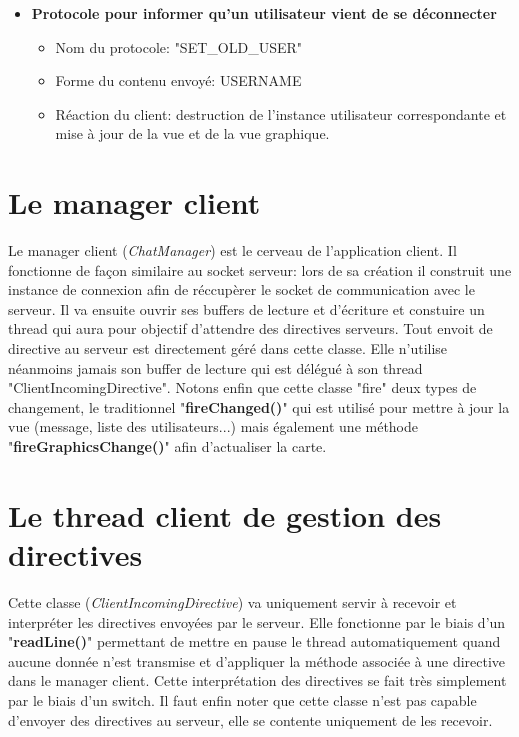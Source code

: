 \documentclass[a4paper,12pt]{report}
\begin{document}
\begin{itemize}
\begin{itemize}
        \end{itemize}
      \item \textbf{Protocole pour informer qu'un utilisateur vient de se déconnecter}
        \begin{itemize}
          \item Nom du protocole: "SET\_OLD\_USER"
          \item Forme du contenu envoyé: USERNAME
          \item Réaction du client: destruction de l'instance utilisateur correspondante et mise à jour de la vue et de la vue graphique.
        \end{itemize}
    \end{itemize}

    \section{Le manager client}
      Le manager client (\emph{ChatManager}) est le cerveau de l'application client. Il fonctionne de façon similaire au socket serveur: lors de sa création il construit une instance de connexion afin de réccupèrer le socket de communication avec le serveur. Il va ensuite ouvrir ses buffers de lecture et d'écriture et constuire un thread qui aura pour objectif d'attendre des directives serveurs.
      \medbreak
      Tout envoit de directive au serveur est directement géré dans cette classe. Elle n'utilise néanmoins jamais son buffer de lecture qui est délégué à son thread "ClientIncomingDirective".
      \medbreak
      Notons enfin que cette classe "fire" deux types de changement, le traditionnel "\textbf{fireChanged()}" qui est utilisé pour mettre à jour la vue (message, liste des utilisateurs...) mais également une méthode "\textbf{fireGraphicsChange()}" afin d'actualiser la carte.

    \section{Le thread client de gestion des directives}
      Cette classe (\emph{ClientIncomingDirective}) va uniquement servir à recevoir et interpréter les directives envoyées par le serveur. Elle fonctionne par le biais d'un "\textbf{readLine()}" permettant de mettre en pause le thread automatiquement quand aucune donnée n'est transmise et d'appliquer la méthode associée à une directive dans le manager client. Cette interprétation des directives se fait très simplement par le biais d'un switch.
      \medbreak
      Il faut enfin noter que cette classe n'est pas capable d'envoyer des directives au serveur, elle se contente uniquement de les recevoir.
\end{document}
